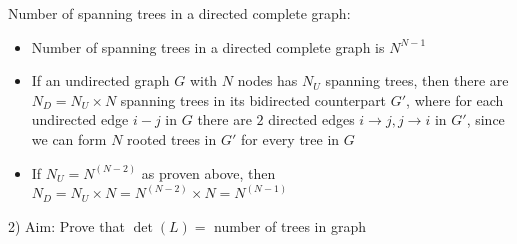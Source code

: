 Number of spanning trees in a directed complete graph:
\begin{itemize}
    \item Number of spanning trees in a directed complete graph is $N^{N-1}$ 
    \item If an undirected graph $G$ with $N$ nodes has $N_U$ spanning trees, then there are $N_D = N_U \times N$ spanning trees in its bidirected counterpart $G'$, where for each undirected edge $i - j$ in $G$ there are $2$ directed edges $i \to j, j \to i$ in $G'$, since we can form $N$ rooted trees in $G'$ for every tree in $G$
    \item If $N_U = N^{(N-2)}$ as proven above, then $N_D = N_U \times N = N^{(N-2)} \times N = N^{(N-1)}$
\end{itemize}
2) Aim: Prove that $\det({L}) =$ number of trees in graph\\
